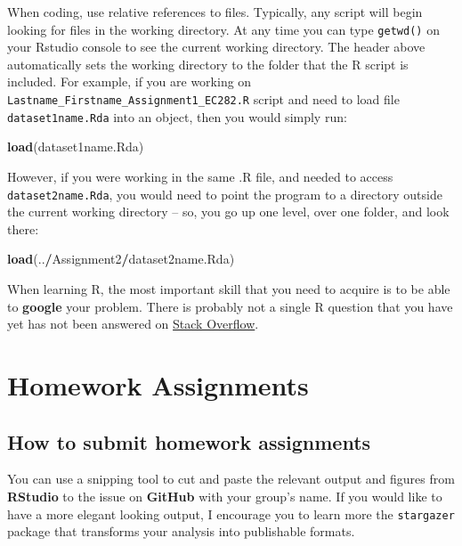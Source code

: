 \documentclass[
]{book}
\newenvironment{Shaded}{\begin{snugshade}}{\end{snugshade}}
\newcommand{\KeywordTok}[1]{\textcolor[rgb]{0.13,0.29,0.53}{\textbf{#1}}}
\newcommand{\NormalTok}[1]{#1}
\newcommand{\OperatorTok}[1]{\textcolor[rgb]{0.81,0.36,0.00}{\textbf{#1}}}
\begin{document}
When coding, use relative references to files. Typically, any script will begin looking for files in the working directory. At any time you can type \texttt{getwd()} on your Rstudio console to see the current working directory. The header above automatically sets the working directory to the folder that the R script is included. For example, if you are working on \texttt{Lastname\_Firstname\_Assignment1\_EC282.R} script and need to load file \texttt{dataset1name.Rda} into an object, then you would simply run:

\begin{Shaded}
\begin{Highlighting}[]
\KeywordTok{load}\NormalTok{(dataset1name.Rda)}
\end{Highlighting}
\end{Shaded}

However, if you were working in the same .R file, and needed to access \texttt{dataset2name.Rda}, you would need to point the program to a directory outside the current working directory -- so, you go up one level, over one folder, and look there:

\begin{Shaded}
\begin{Highlighting}[]
\KeywordTok{load}\NormalTok{(..}\OperatorTok{/}\NormalTok{Assignment2}\OperatorTok{/}\NormalTok{dataset2name.Rda)}
\end{Highlighting}
\end{Shaded}

When learning R, the most important skill that you need to acquire is to be able to \textbf{google} your problem. There is probably not a single R question that you have yet has not been answered on \href{https://stackoverflow.com/}{Stack Overflow}.

\hypertarget{homework-assignments}{%
\chapter{Homework Assignments}\label{homework-assignments}}

\hypertarget{how-to-submit-homework-assignments}{%
\section{How to submit homework assignments}\label{how-to-submit-homework-assignments}}

You can use a snipping tool to cut and paste the relevant output and figures from \textbf{RStudio} to the issue on \textbf{GitHub} with your group's name. If you would like to have a more elegant looking output, I encourage you to learn more the \texttt{stargazer} package that transforms your analysis into publishable formats.
\end{document}
